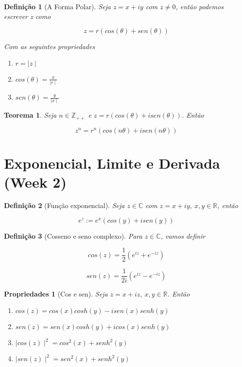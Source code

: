 \documentclass{article}
\newtheorem{prop}{Propriedades}
\newtheorem{theorem}{Teorema}
\newtheorem{definition}{Definição}
\begin{document}
\begin{definition}[A Forma Polar]
Seja $z = x + iy$ com $z \neq 0$, então podemos escrever z como

$$z = r(cos(\theta) + sen(\theta))$$

Com as seguintes propriedades

\begin{enumerate}
    \item $r = \mid z \mid $
    
    \item $cos(\theta) = \frac{x}{\mid r \mid}$
    
    \item $sen(\theta) = \frac{y}{\mid x \mid}$
\end{enumerate}
\end{definition}

\begin{theorem}
Seja $n \in \mathbb{Z}_{++}$ e $z = r(cos(\theta) + i sen(\theta))$. Então

$$z^n = r^n (cos(n\theta) + i sen(n\theta))$$
\end{theorem}

\section*{Exponencial, Limite e Derivada (Week 2)}
\label{s2}
\begin{definition}[Função exponencial]
Seja $z \in \mathbb{C}$ com $z = x + iy,\ x,y \in \mathbb{R}$, então 

$$e^z := e^x(cos(y) + i sen(y))$$
\end{definition}

\begin{definition}[Cosseno e seno complexo]
Para $z \in \mathbb{C}$, vamos definir

$$cos(z) = \frac{1}{2}(e^{iz} + e^{- iz})$$

$$sen(z) = \frac{1}{2 i}(e^{iz} - e^{- iz})$$
\end{definition}


\begin{prop}[Cos e sen]
Seja $z = x + iz,\ x, y \in \mathbb{R}$. Então

\begin{enumerate}[label=(\alph*)]
    \item $cos(z) = cos(x) cosh(y) - i sen(x) senh(y)$
    
    \item $sen(z) = sen(x) cosh(y) + i cos(x) senh(y)$
    
    \item $\mid cos(z) \mid^2 = cos^2(x) + senh^2(y)$
    
    \item $\mid sen(z) \mid^2 = sen^2(x) + senh^2(y)$
\end{enumerate}
\end{prop}
\end{document}
